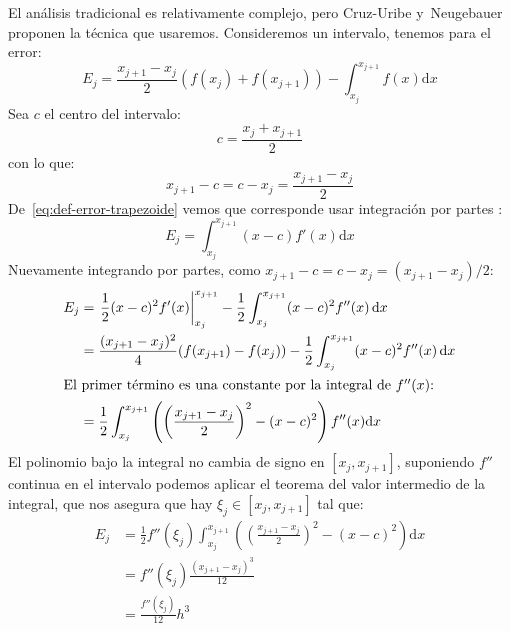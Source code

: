   El análisis tradicional es relativamente complejo,
  pero Cruz-Uribe y~Neugebauer~%
    \cite{cruz-uribe03:_elemen_proof_error_estim_trapez_rule}
  proponen la técnica que usaremos.
  Consideremos un intervalo,
  tenemos para el error:
  \begin{equation}
    \label{eq:def-error-trapezoide}
    E_j
      = \frac{x_{j + 1} - x_j}{2} (f(x_j) + f(x_{j + 1}))
          - \int_{x_j}^{x_{j + 1}} f(x) \mathrm{d} x
  \end{equation}
  Sea \(c\) el centro del intervalo:
  \begin{equation*}
    c
      = \frac{x_j + x_{j + 1}}{2}
  \end{equation*}
  con lo que:
  \begin{equation*}
    x_{j + 1} - c
      = c - x_j
      = \frac{x_{j + 1} - x_j}{2}
  \end{equation*}
  De~\eqref{eq:def-error-trapezoide}
  vemos que corresponde usar integración por partes :
  \begin{equation*}
    E_j
      = \int_{x_j}^{x_{j + 1}} (x - c) f'(x) \mathrm{d} x
  \end{equation*}
  Nuevamente integrando por partes,
  como \(x_{j + 1} - c = c - x_j = (x_{j + 1} - x_j) / 2\):
  \begin{align*}
    E_j
      &= \left. \frac{1}{2}(x - c)^2 f'(x) \right|_{x_j}^{x_{j + 1}}
           - \frac{1}{2} \int_{x_j}^{x_{j + 1}}
               (x - c)^2 f''(x) \, \mathrm{d} x \\
      &= \frac{(x_{j + 1} - x_j)^2}{4} (f(x_{j + 1}) - f(x_j))
           - \frac{1}{2} \int_{x_j}^{x_{j + 1}}
               (x - c)^2 f''(x) \, \mathrm{d} x \\
  \intertext{El primer término
             es una constante por la integral de \(f''(x)\):}
      &= \frac{1}{2}
           \int_{x_j}^{x_{j + 1}}
                    \left(
                      \left(
                        \frac{x_{j + 1} - x_j}{2}
                      \right)^2
                        - (x - c)^2
                    \right) f''(x) \mathrm{d} x
  \end{align*}
  El polinomio bajo la integral no cambia de signo en \([x_j, x_{j + 1}]\),
  suponiendo \(f''\) continua en el intervalo
  podemos aplicar el teorema del valor intermedio de la integral,
  que nos asegura que hay \(\xi_j \in [x_j, x_{j + 1}]\) tal que:
  \begin{align*}
    E_j
      &= \frac{1}{2} f''(\xi_j)
                   \int_{x_j}^{x_{j + 1}}
                      \left(
                        \left(
                          \frac{x_{j + 1} - x_j}{2}
                        \right)^2
                          - (x - c)^2
                    \right) \mathrm{d} x \\
      &= f''(\xi_j) \frac{(x_{j + 1} - x_j)^3}{12} \\
      &= \frac{f''(\xi_j)}{12} h^3
  \end{align*}

